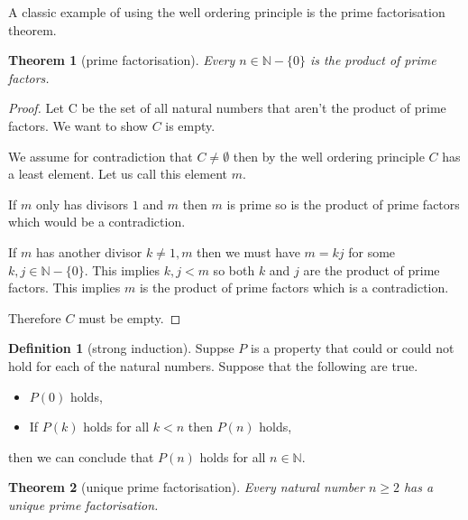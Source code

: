 \documentclass[
]{book}
\newtheorem{theorem}{Theorem}[chapter]
\theoremstyle{definition}
\newtheorem{definition}{Definition}[chapter]
\theoremstyle{definition}
\theoremstyle{definition}
\theoremstyle{definition}
\theoremstyle{remark}
\begin{document}
A classic example of using the well ordering principle is the prime factorisation theorem.

\begin{theorem}[prime factorisation]
Every \(n \in \mathbb{N}-\{0\}\) is the product of prime factors.
\end{theorem}

\begin{proof}
Let C be the set of all natural numbers that aren't the product of prime factors. We want to show \(C\) is empty.

We assume for contradiction that \(C \neq \emptyset\) then by the well ordering principle \(C\) has a least element. Let us call this element \(m\).

If \(m\) only has divisors \(1\) and \(m\) then \(m\) is prime so is the product of prime factors which would be a contradiction.

If \(m\) has another divisor \(k \neq 1,m\) then we must have \(m=kj\) for some \(k, j \in \mathbb{N}-\{0\}\). This implies \(k, j < m\) so both \(k\) and \(j\) are the product of prime factors. This implies \(m\) is the product of prime factors which is a contradiction.

Therefore \(C\) must be empty.
\end{proof}

\begin{definition}[strong induction]
Suppse \(P\) is a property that could or could not hold for each of the natural numbers. Suppose that the following are true.

\begin{itemize}
\item
  \(P(0)\) holds,
\item
  If \(P(k)\) holds for all \(k<n\) then \(P(n)\) holds,
\end{itemize}

then we can conclude that \(P(n)\) holds for all \(n \in \mathbb{N}\).
\end{definition}

\begin{theorem}[unique prime factorisation]
Every natural number \(n \geq 2\) has a \emph{unique} prime factorisation.
\end{theorem}
\end{document}
